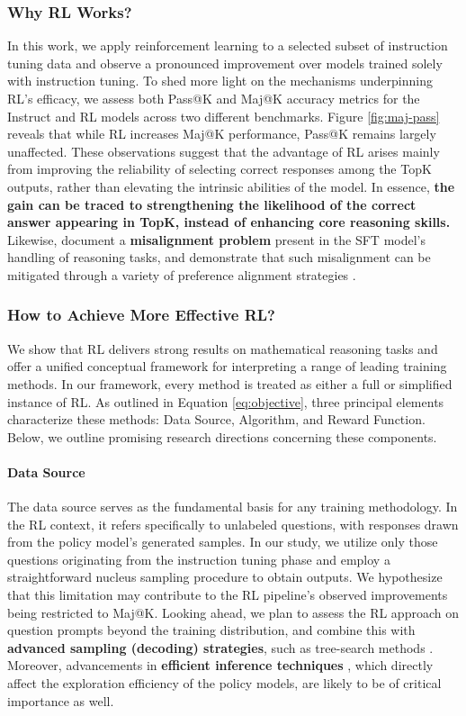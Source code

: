 {\subsubsection{Why RL Works?} In this work, we apply reinforcement learning to a selected subset of instruction tuning data and observe a pronounced improvement over models trained solely with instruction tuning. To shed more light on the mechanisms underpinning RL’s efficacy, we assess both Pass@K and Maj@K accuracy metrics for the Instruct and RL models across two different benchmarks. Figure \ref{fig:maj-pass} reveals that while RL increases Maj@K performance, Pass@K remains largely unaffected. These observations suggest that the advantage of RL arises mainly from improving the reliability of selecting correct responses among the TopK outputs, rather than elevating the intrinsic abilities of the model. In essence, \textbf{the gain can be traced to strengthening the likelihood of the correct answer appearing in TopK, instead of enhancing core reasoning skills.} Likewise, \citep{wang2023making} document a \textbf{misalignment problem} present in the SFT model’s handling of reasoning tasks, and demonstrate that such misalignment can be mitigated through a variety of preference alignment strategies \citep{yuan2023rrhf,song2023preference,wang2023making}.

\subsubsection{How to Achieve More Effective RL?}
\label{sec:effec_rl}
We show that RL delivers strong results on mathematical reasoning tasks and offer a unified conceptual framework for interpreting a range of leading training methods. In our framework, every method is treated as either a full or simplified instance of RL. As outlined in Equation \ref{eq:objective}, three principal elements characterize these methods: Data Source, Algorithm, and Reward Function. Below, we outline promising research directions concerning these components.

\paragraph{Data Source} The data source serves as the fundamental basis for any training methodology. In the RL context, it refers specifically to unlabeled questions, with responses drawn from the policy model’s generated samples. In our study, we utilize only those questions originating from the instruction tuning phase and employ a straightforward nucleus sampling procedure to obtain outputs. We hypothesize that this limitation may contribute to the RL pipeline’s observed improvements being restricted to Maj@K. Looking ahead, we plan to assess the RL approach on question prompts beyond the training distribution, and combine this with \textbf{advanced sampling (decoding) strategies}, such as tree-search methods \citep{yao2023tree}. Moreover, advancements in \textbf{efficient inference techniques} \citep{xia-etal-2023-speculative,leviathan2023fast,kwon2023efficient,xia2024unlocking}, which directly affect the exploration efficiency of the policy models, are likely to be of critical importance as well.

}
